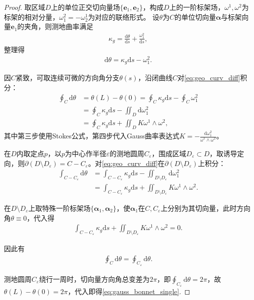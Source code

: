 \documentclass[../../main.tex]{subfiles}%
\begin{document}
\begin{proof}

取区域$D$上的单位正交切向量场$\{\boldsymbol{e}_1,\boldsymbol{e}_2\}$，构成$D$上的一阶标架场，$\omega^1,\omega^2$为标架的相对分量，$\omega_1^2=-\omega_2^1$为对应的联络形式。
设$\theta$为$C$的单位切向量$\boldsymbol{\alpha}$与标架向量$\boldsymbol{e}_1$的夹角，则测地曲率满足
\begin{align*}
\kappa_g = \frac{\mathrm{d}\theta}{\mathrm{d}s} + \frac{\omega_1^2}{\mathrm{d}s},
\end{align*}
整理得
\begin{align}
\mathrm{d}\theta = \kappa_g \mathrm{d}s - \omega_1^2. \label{eq:geo_curv_diff}
\end{align}

因$C$紧致，可取连续可微的方向角分支$\theta(s)$，沿闭曲线$C$对\eqref{eq:geo_curv_diff}积分：
\begin{align*}
\oint_C \mathrm{d}\theta &= \theta(L)-\theta(0) = \oint_C \kappa_g \mathrm{d}s - \oint_C \omega_1^2 \\
&= \oint_C \kappa_g \mathrm{d}s - \iint_D \mathrm{d}\omega_1^2 \\
&= \oint_C \kappa_g \mathrm{d}s + \iint_D K \omega^1 \land \omega^2,
\end{align*}
其中第三步使用Stokes公式，第四步代入Gauss曲率表达式$K=-\frac{\mathrm{d}\omega_1^2}{\omega^1\land\omega^2}$。

在$D$内取定点$p$，以$p$为中心作半径$\varepsilon$的测地圆周$C_\varepsilon$，围成区域$D_\varepsilon\subset D$，取诱导定向，则$\partial(D\setminus D_\varepsilon)=C-C_\varepsilon$。对\eqref{eq:geo_curv_diff}在$\partial(D\setminus D_\varepsilon)$上积分：
\begin{align*}
\int_{C-C_\varepsilon} \mathrm{d}\theta &= \int_{C-C_\varepsilon} \kappa_g \mathrm{d}s - \iint_{D\setminus D_\varepsilon} \mathrm{d}\omega_1^2 \\
&= \int_{C-C_\varepsilon} \kappa_g \mathrm{d}s + \iint_{D\setminus D_\varepsilon} K \omega^1 \land \omega^2.
\end{align*}

在$D\setminus D_\varepsilon$上取特殊一阶标架场$\{\boldsymbol{\alpha}_1,\boldsymbol{\alpha}_2\}$，使$\boldsymbol{\alpha}_1$在$C,C_\varepsilon$上分别为其切向量，此时方向角$\theta\equiv0$，代入得
\begin{align}
\int_{C-C_\varepsilon} \kappa_g \mathrm{d}s + \iint_{D\setminus D_\varepsilon} K \omega^1 \land \omega^2 = 0. \label{eq:zero_int}
\end{align}

因此有
\begin{align}
\oint_C \mathrm{d}\theta = \oint_{C_\varepsilon} \mathrm{d}\theta. \label{eq:angle_eq}
\end{align}

测地圆周$C_\varepsilon$绕行一周时，切向量方向角总变差为$2\pi$，即$\oint_{C_\varepsilon}\mathrm{d}\theta=2\pi$，故$\theta(L)-\theta(0)=2\pi$，代入即得\eqref{eq:gauss_bonnet_single}.

\end{proof}
\end{document}

